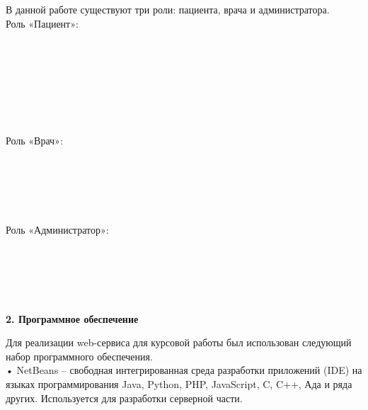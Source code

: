 \documentclass[a4paper]{article}
\begin{document}
\normalsize{В данной работе существуют три роли: пациента, врача и администратора. }\\


\normalsize{Роль «Пациент»: }\\
 \begin{itemize}
 \\
 \\
 \\
 \\
 \\
 \\
 \end{itemize}
\normalsize{Роль «Врач»:}\\
 \begin{itemize}
 \\
 \\
 \\
 \\
 \end{itemize}
\normalsize{Роль «Администратор»:}\\
 \begin{itemize}
\\
\\
\\
\\
 \end{itemize}

\newpage

\hfill \break
\hfill \break
\begin{center}
\Large{\textbf{2. Программное обеспечение}}\\
\end{center}


\normalsize{Для реализации web-сервиса для курсовой работы был использован следующий набор программного обеспечения. 
}\\

\normalsize{•	NetBeans – свободная интегрированная среда разработки приложений (IDE) на языках программирования Java, Python, PHP, JavaScript, C, C++, Ада и ряда других. Используется для разработки серверной части.
}\\
\end{document}
